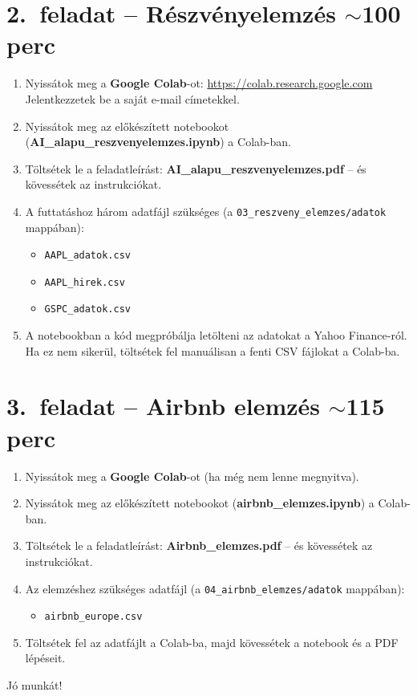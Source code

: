 \documentclass[11pt,a4paper]{article}
\newcommand{\taskbox}[2]{%
  \begin{tcolorbox}[taskstyle, title=#1]
  #2
  \end{tcolorbox}\vspace{4pt}}
\begin{document}
\section{2.\ feladat -- Részvényelemzés \hfill {\normalsize\color{medgray}$\sim$100 perc}}

\taskbox{Teendők}{
\begin{enumerate}[leftmargin=1.5em]
  \item Nyissátok meg a \textbf{Google Colab}-ot: \url{https://colab.research.google.com}\\
    Jelentkezzetek be a saját e-mail címetekkel.
  \item Nyissátok meg az előkészített notebookot (\textbf{AI\_alapu\_reszvenyelemzes.ipynb}) a Colab-ban.
  \item Töltsétek le a feladatleírást: \textbf{AI\_alapu\_reszvenyelemzes.pdf} -- és kövessétek az instrukciókat.
  \item A futtatáshoz három adatfájl szükséges (a \texttt{03\_reszveny\_elemzes/adatok} mappában):
    \begin{itemize}
      \item \texttt{AAPL\_adatok.csv}
      \item \texttt{AAPL\_hirek.csv}
      \item \texttt{GSPC\_adatok.csv}
    \end{itemize}
  \item A notebookban a kód megpróbálja letölteni az adatokat a Yahoo Finance-ról. Ha ez nem sikerül, töltsétek fel manuálisan a fenti CSV fájlokat a Colab-ba.
\end{enumerate}
}

\section{3.\ feladat -- Airbnb elemzés \hfill {\normalsize\color{medgray}$\sim$115 perc}}

\taskbox{Teendők}{
\begin{enumerate}[leftmargin=1.5em]
  \item Nyissátok meg a \textbf{Google Colab}-ot (ha még nem lenne megnyitva).
  \item Nyissátok meg az előkészített notebookot (\textbf{airbnb\_elemzes.ipynb}) a Colab-ban.
  \item Töltsétek le a feladatleírást: \textbf{Airbnb\_elemzes.pdf} -- és kövessétek az instrukciókat.
  \item Az elemzéshez szükséges adatfájl (a \texttt{04\_airbnb\_elemzes/adatok} mappában):
    \begin{itemize}
      \item \texttt{airbnb\_europe.csv}
    \end{itemize}
  \item Töltsétek fel az adatfájlt a Colab-ba, majd kövessétek a notebook és a PDF lépéseit.
\end{enumerate}
}

\vfill
\begin{center}
  \small\color{medgray} Jó munkát!
\end{center}
\end{document}
